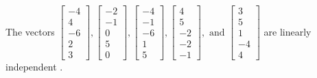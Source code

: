 \begin{exercise}
\begin{exerciseStatement}
  \end{exerciseStatement}
  \begin{exerciseAnswer}
   The vectors \(\left[\begin{array}{r}
-4 \\
4 \\
-6 \\
2 \\
3
\end{array}\right] , \left[\begin{array}{r}
-2 \\
-1 \\
0 \\
5 \\
0
\end{array}\right] , \left[\begin{array}{r}
-4 \\
-1 \\
-6 \\
1 \\
5
\end{array}\right] , \left[\begin{array}{r}
4 \\
5 \\
-2 \\
-2 \\
-1
\end{array}\right] , \text{ and } \left[\begin{array}{r}
3 \\
5 \\
1 \\
-4 \\
4
\end{array}\right]\) are 
  	 linearly independent  .
  


  \end{exerciseAnswer}
\end{exercise}